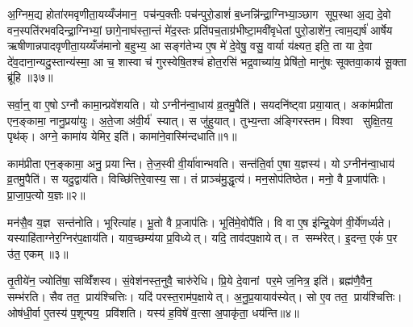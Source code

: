 अ॒ग्निम॒द्य होता॑रमवृणीता॒यय्यँज॑मान॒ पच॑न्प॒क्तीः पच॑न्पुरो॒डाशं॑ ब॒ध्नन्नि॑न्द्रा॒ग्निभ्या॒ञ्छाग सूप॒स्था अ॒द्य दे॒वो वन॒स्पति॑रभवदिन्द्रा॒ग्निभ्यां॒ छागे॒नाघ॑स्ता॒न्तं मे॑द॒स्तः प्रति॑पच॒ताग्र॑भीष्टा॒मवी॑वृधेतां पुरो॒डाशे॑न॒ त्वाम॒द्यर्\mbox{}ष॑ आर्\mbox{}षेय ऋषीणान्नपादवृणीता॒यय्यँज॑मानो ब॒हुभ्य॒ आ सङ्ग॑तेभ्य ए॒ष मे॑ दे॒वेषु॒ वसु॒ वार्या य॑क्ष्यत॒ इति॒ ता या दे॒वा दे॑व॒दाना॒न्यदु॒स्तान्य॑स्मा॒ आ च॒ शास्वा च॑ गुरस्वेषि॒तश्च॑ होत॒रसि॑ भद्र॒वाच्या॑य॒ प्रेषि॑तो॒ मानु॑षः सूक्तवा॒काय॑ सू॒क्ता ब्रू॑हि ॥३७॥\anuvakamend[अ॒ग्निम॒द्यैकम्]





\clearpage
{}
\setcounter{anuvakam}{0}
सर्वा॒न्॒ वा ए॒षोऽग्नौ कामा॒न्प्रवे॑शयति। योऽग्नीन॑न्वा॒धाय॑ व्र॒तमु॒पैति॑। सयदनि॑ष्ट्वा प्रया॒यात्। अका॑मप्रीता एन॒ङ्कामा॒ नानु॒प्रया॑युः। अ॒ते॒जा अ॑वी॒र्य॑ स्यात्। स जु॑हुयात्। तुभ्य॒न्ता अ॑ङ्गिरस्तम। विश्वा सुक्षि॒तय॒ पृथ॑क्। अग्ने॒ कामा॑य येमिर॒ इति॑। कामा॑ने॒वास्मि॑न्दधाति॥१॥

काम॑प्रीता एन॒ङ्कामा॒ अनु॒ प्रयान्ति। ते॒ज॒स्वी वी॒र्या॑वान्भवति। सन्त॑ति॒र्वा ए॒षा य॒ज्ञस्य॑। योऽग्नीन॑न्वा॒धाय॑ व्र॒तमु॒पैति॑। स यदु॒द्वाय॑ति। विच्छि॑त्तिरे॒वास्य॒ सा। तं प्राञ्च॑मु॒द्धृत्य॑। मन॒सोप॑तिष्ठेत। मनो॒ वै प्र॒जाप॑तिः। प्रा॒जा॒प॒त्यो य॒ज्ञः॥२॥

मन॑सै॒व य॒ज्ञ सन्त॑नोति। भूरित्या॑ह। भू॒तो वै प्र॒जाप॑तिः। भूति॑मे॒वोपै॑ति। वि वा ए॒ष इ॑न्द्रि॒येण॑ वी॒र्ये॑णर्ध्यते। यस्याहि॑ताग्नेर॒ग्निर॑प॒क्षाय॑ति। याव॒च्छम्य॑या प्र॒विध्येत्। यदि॒ ताव॑दप॒क्षायेत्। त सम्भ॑रेत्। इ॒दन्त॒ एकं॑ प॒र उ॑त॒ एकम्॥३॥

तृ॒तीये॑न॒ ज्योति॑षा॒ सव्विँ॑शस्व। सं॒वेश॑नस्त॒नुवै॒ चारु॑रेधि। प्रि॒ये दे॒वानां पर॒मे ज॒नित्र॒ इति॑। ब्रह्म॑णै॒वैन॒ सम्भ॑रति। सैव तत॒ प्राय॑श्चित्तिः। यदि॑ परस्त॒राम॑प॒क्षायेत्। अ॒नु॒प्र॒यायाव॑स्येत्। सो ए॒व तत॒ प्राय॑श्चित्तिः। ओष॑धी॒र्वा ए॒तस्य॑ प॒शून्पय॒ प्रवि॑शति। यस्य॑ ह॒विषे॑ व॒त्सा अ॒पाकृ॑ता॒ धय॑न्ति॥४॥

